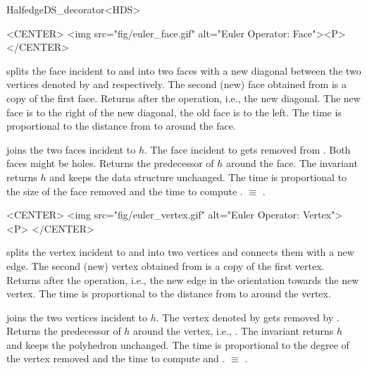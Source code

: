 \begin{ccRefClass}{HalfedgeDS_decorator<HDS>}
\begin{ccHtmlOnly}
    <CENTER>
    <img src="fig/euler_face.gif" alt="Euler Operator: Face"><P>
    </CENTER>
\end{ccHtmlOnly}

    {splits the face incident to  and  into two faces
     with a new diagonal between the two vertices denoted by  and
      respectively. The second (new) face obtained from
      is a copy of the first face. Returns  after the
     operation, i.e., the new diagonal. The new face is to the right of the
     new diagonal, the old face is to the left. The time is proportional
     to the distance from  to  around the face.}

    {joins the two faces incident to $h$. The face incident to
       gets removed from . Both faces might be
    holes. Returns the predecessor of $h$ around the face. The invariant
     returns $h$ and keeps
    the data structure unchanged. The time is proportional to the size
    of the face removed and the time to compute .
      $\equiv$
    .}


\begin{ccHtmlOnly}
    <CENTER>
    <img src="fig/euler_vertex.gif" alt="Euler Operator: Vertex"><P>
    </CENTER>
\end{ccHtmlOnly}

    {splits the vertex incident to  and  into two vertices
     and connects them with a new edge. The second (new) vertex
     obtained from  is a copy of the first vertex. Returns
      after the operation, i.e., the new edge
     in the orientation towards the new vertex. The time is proportional
     to the distance from  to  around the vertex.}

    {joins the two vertices incident to $h$. The vertex denoted by
      gets removed by . Returns the predecessor of
     $h$ around the vertex, i.e., . The invariant
      returns $h$
     and keeps the polyhedron unchanged.
     The time is proportional to the degree of the vertex removed and
     the time to compute  and .
       $\equiv$
     .}


\end{ccRefClass}
